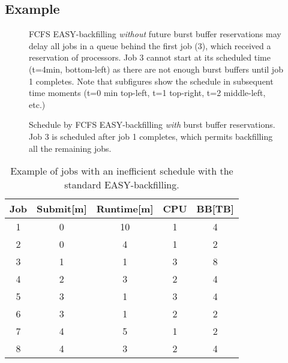 \documentclass[runningheads]{llncs}
\begin{document}
\subsection{Example} \label{sec:example}

\begin{figure}[p]
  \centering
  \caption{FCFS EASY-backfilling \emph{without} future burst buffer reservations may delay all jobs in a queue behind the first job (3), which received a reservation of processors. Job 3 cannot start at its scheduled time (t=4min, bottom-left) as there are not enough burst buffers until job 1 completes. Note that subfigures show the schedule in subsequent time moments (t=0 min top-left, t=1 top-right, t=2 middle-left, etc.)}
  \vspace{0.5cm}
  \label{fig:example-starvation}
  \caption{Schedule by FCFS EASY-backfilling \emph{with} burst buffer reservations. Job 3 is scheduled after job 1 completes, which permits backfilling all the remaining jobs.}
  \label{fig:example-bb-aware}
\end{figure}

\begin{wraptable}{r}{6.5cm}
  \vspace{-1cm}
  \centering
  \caption{Example of jobs with an inefficient schedule with the standard EASY-backfilling.}
  \begin{tabular}{ccccc}
    \toprule
    Job & Submit[m] & Runtime[m] & CPU & BB[TB]\\
    \midrule
    1 & 0 & 10 & 1 & 4\\
    2 & 0 & 4 & 1 & 2\\
    3 & 1 & 1 & 3 & 8\\
    4 & 2 & 3 & 2 & 4\\
    5 & 3 & 1 & 3 & 4\\
    6 & 3 & 1 & 2 & 2\\
    7 & 4 & 5 & 1 & 2\\
    8 & 4 & 3 & 2 & 4\\
    \bottomrule
  \end{tabular}
  \label{tab:jobs}
  \vspace{-0.7cm}
\end{wraptable}
\end{document}
